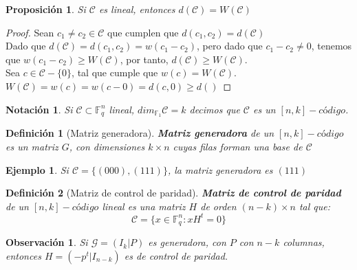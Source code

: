 \documentclass[spanish]{book}
\newtheorem{mydef}{Definición}
\newtheorem{nota}{Notación}
\newtheorem{ejem}{Ejemplo}
\newtheorem{obsv}{Observación}
\newtheorem{proposi}{Proposición}
\begin{document}
\newpage
\begin{proposi}
	Si $\mathcal{C}$ es lineal, entonces $d(\mathcal{C})=W(\mathcal{C})$
\end{proposi}

\begin{proof}
	Sean $c_1\neq c_2 \in \mathcal{C}$ que cumplen que $d(c_1, c_2)=d(\mathcal{C})$ \\
	Dado que $d(\mathcal{C})=d(c_1, c_2)=w(c_1-c_2)$, pero dado que $c_1-c_2 \neq 0$, tenemos que $w(c_1-c_2)\geq W(\mathcal{C})$, por tanto, $d(\mathcal{C}) \geq W(\mathcal{C})$. \\
	Sea $c \in \mathcal{C}-\{0\}$, tal que cumple que $w(c)=W(\mathcal{C})$. \\
	$W(\mathcal{C})=w(c)=w(c-0)=d(c, 0)\geq d()$
\end{proof}

\begin{nota}
	Si $\mathcal{C} \subset \mathbb{F}_q^n$ lineal, $dim _{\mathbb{F}_1} \mathcal{C}=k$ decimos que $\mathcal{C}$ es un $[n, k]-código$.
\end{nota}

\begin{mydef}[Matriz generadora]
	\textbf{Matriz generadora} de un $[n, k]-código$ es un matriz $G$, con dimensiones $k\times n$ cuyas filas forman una base de $\mathcal{C}$
\end{mydef}

\begin{ejem}
	Si $\mathcal{C}=\{(000), (111)\}$, la matriz generadora es $(111)$
\end{ejem}

\begin{mydef}[Matriz de control de paridad]
	\textbf{Matriz de control de paridad} de un $[n, k]-código$ lineal es una matriz $H$ de orden $(n-k)\times n$ tal que: $$ \mathcal{C}=\{x \in \mathbb{F}_q^n: x H^t=0\}$$
\end{mydef}

\begin{obsv}
	Si $\mathcal{G}=(I_k | P)$ es generadora, con $P$ con $n-k$ columnas, entonces $H=(-p^t | I_{n-k})$ es de control de paridad.
\end{obsv}
\end{document}
